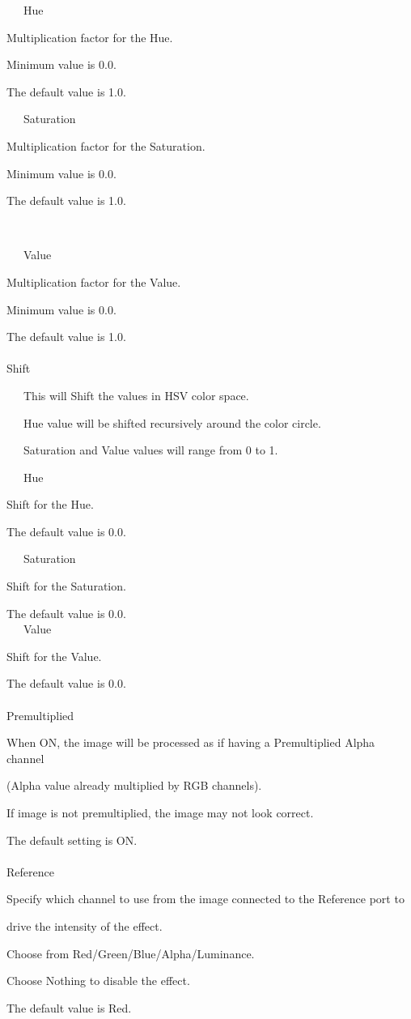 \documentclass[a4paper,12pt]{article}
\begin{document}
\noindent \ \ \, Hue\par
Multiplication factor for the Hue.\par
Minimum value is 0.0.\par
The default value is 1.0.\par
\noindent \ \ \, Saturation\par
Multiplication factor for the Saturation.\par
Minimum value is 0.0.\par
The default value is 1.0.\par

\newpage

\thispagestyle{empty}

\ \vspace{-0.2em}
\par
\noindent \ \ \, Value\par
Multiplication factor for the Value.\par
Minimum value is 0.0.\par
The default value is 1.0.\\
\\
Shift\par
\noindent \ \ \, This will Shift the values in HSV color space.\par
\noindent \ \ \, Hue value will be shifted recursively around the color circle.\par
\noindent \ \ \, Saturation and Value values will range from 0 to 1.\\
\par
\noindent \ \ \, Hue\par
Shift for the Hue.\par
The default value is 0.0.\par
\noindent \ \ \, Saturation\par
Shift for the Saturation.\par
The default value is 0.0.\\
\noindent \ \ \, Value\par
Shift for the Value.\par
The default value is 0.0.\\
\\
Premultiplied\par
When ON, the image will be processed as if having a Premultiplied Alpha channel\par 
(Alpha value already multiplied by RGB channels).\par
If image is not premultiplied, the image may not look correct.\par
The default setting is ON.\\
\\
Reference\par
Specify which channel to use from the image connected to the Reference port to\par 
drive the intensity of the effect.\par
Choose from Red/Green/Blue/Alpha/Luminance.\par
Choose Nothing to disable the effect.\par
The default value is \textquotedbl Red\textquotedbl .
\end{document}
